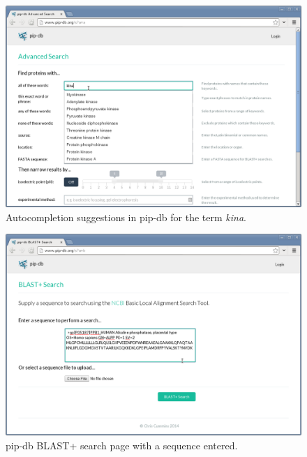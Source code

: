 \begin{figure}[H]
\centering
    \includegraphics[width=\textwidth]{assets/pip-db-autocomplete}
\caption[Autocompletion suggestions in pip-db]
        {Autocompletion suggestions in pip-db for the term \textit{kina}.}
\label{fig:pip-db-autocomplete}
\end{figure}


\begin{figure}[H]
\centering
    \includegraphics[width=\textwidth]{assets/pip-db-blast}
\caption[pip-db BLAST+ search page]
        {pip-db BLAST+ search page with a sequence entered.}
\label{fig:pip-db-blast}
\end{figure}


